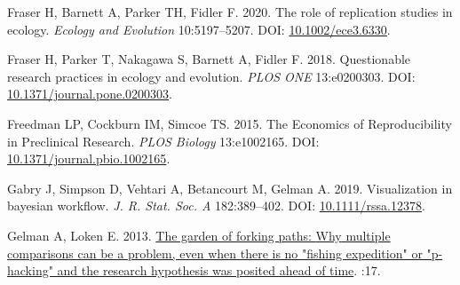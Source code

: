 \documentclass[10pt,a4paper]{article}
\newlength{\cslhangindent}
\newlength{\cslentryspacingunit} %
\newenvironment{CSLReferences}[2] %
 {%
  \setlength{\parindent}{0pt}
  \ifodd #1
  \let\oldpar\par
  \def\par{\hangindent=\cslhangindent\oldpar}
  \fi
  \setlength{\parskip}{#2\cslentryspacingunit}
 }%
 {}
\begin{document}
\begin{CSLReferences}{1}{0}
\leavevmode{}%
Fraser H, Barnett A, Parker TH, Fidler F. 2020. The role of replication studies in ecology. \emph{Ecology and Evolution} 10:5197--5207. DOI: \href{https://doi.org/10.1002/ece3.6330}{10.1002/ece3.6330}.

\leavevmode{}%
Fraser H, Parker T, Nakagawa S, Barnett A, Fidler F. 2018. Questionable research practices in ecology and evolution. \emph{PLOS ONE} 13:e0200303. DOI: \href{https://doi.org/10.1371/journal.pone.0200303}{10.1371/journal.pone.0200303}.

\leavevmode{}%
Freedman LP, Cockburn IM, Simcoe TS. 2015. The {Economics} of {Reproducibility} in {Preclinical} {Research}. \emph{PLOS Biology} 13:e1002165. DOI: \href{https://doi.org/10.1371/journal.pbio.1002165}{10.1371/journal.pbio.1002165}.

\leavevmode{}%
Gabry J, Simpson D, Vehtari A, Betancourt M, Gelman A. 2019. Visualization in bayesian workflow. \emph{J. R. Stat. Soc. A} 182:389--402. DOI: \href{https://doi.org/10.1111/rssa.12378}{10.1111/rssa.12378}.

\leavevmode{}%
Gelman A, Loken E. 2013. \href{http://www.stat.columbia.edu/~gelman/research/unpublished/p_hacking.pdf}{The garden of forking paths: {Why} multiple comparisons can be a problem, even when there is no "fishing expedition" or "p-hacking" and the research hypothesis was posited ahead of time}. :17.


\end{CSLReferences}
\end{document}

